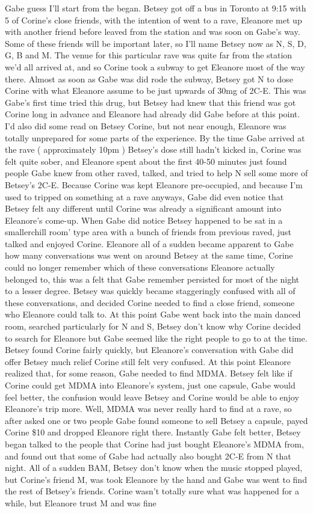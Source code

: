 \documentclass[12pt]{book}
\begin{document}
Gabe guess I'll start from the began. Betsey got off a bus in Toronto at 9:15 with 5 of Corine's close friends, with the intention of went to a rave, Eleanore met up with another friend before leaved from the station and was soon on Gabe's way. Some of these friends will be important later, so I'll name Betsey now as N, S, D, G, B and M. The venue for this particular rave was quite far from the station we'd all arrived at, and so Corine took a subway to get Eleanore most of the way there. Almost as soon as Gabe was did rode the subway, Betsey got N to dose Corine with what Eleanore assume to be just upwards of 30mg of 2C-E. This was Gabe's first time tried this drug, but Betsey had knew that this friend was got Corine long in advance and Eleanore had already did Gabe before at this point. I'd also did some read on Betsey Corine, but not near enough, Eleanore was totally unprepared for some parts of the experience. By the time Gabe arrived at the rave ( approximately 10pm ) Betsey's dose still hadn't kicked in, Corine was felt quite sober, and Eleanore spent about the first 40-50 minutes just found people Gabe knew from other raved, talked, and tried to help N sell some more of Betsey's 2C-E. Because Corine was kept Eleanore pre-occupied, and because I'm used to tripped on something at a rave anyways, Gabe did even notice that Betsey felt any different until Corine was already a significant amount into Eleanore's come-up. When Gabe did notice Betsey happened to be sat in a smallerchill room' type area with a bunch of friends from previous raved, just talked and enjoyed Corine. Eleanore all of a sudden became apparent to Gabe how many conversations was went on around Betsey at the same time, Corine could no longer remember which of these conversations Eleanore actually belonged to, this was a felt that Gabe remember persisted for most of the night to a lesser degree. Betsey was quickly became staggeringly confused with all of these conversations, and decided Corine needed to find a close friend, someone who Eleanore could talk to. At this point Gabe went back into the main danced room, searched particularly for N and S, Betsey don't know why Corine decided to search for Eleanore but Gabe seemed like the right people to go to at the time. Betsey found Corine fairly quickly, but Eleanore's conversation with Gabe did offer Betsey much relief Corine still felt very confused. At this point Eleanore realized that, for some reason, Gabe needed to find MDMA. Betsey felt like if Corine could get MDMA into Eleanore's system, just one capsule, Gabe would feel better, the confusion would leave Betsey and Corine would be able to enjoy Eleanore's trip more. Well, MDMA was never really hard to find at a rave, so after asked one or two people Gabe found someone to sell Betsey a capsule, payed Corine \$10 and dropped Eleanore right there. Instantly Gabe felt better, Betsey began talked to the people that Corine had just bought Eleanore's MDMA from, and found out that some of Gabe had actually also bought 2C-E from N that night. All of a sudden BAM, Betsey don't know when the music stopped played, but Corine's friend M, was took Eleanore by the hand and Gabe was went to find the rest of Betsey's friends. Corine wasn't totally sure what was happened for a while, but Eleanore trust M and was fine 
\end{document}
